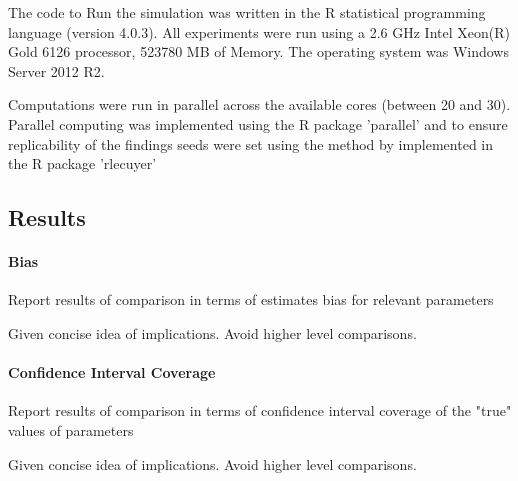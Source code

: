 	The code to Run the simulation was written in the R statistical programming language (version 4.0.3). 
	All experiments were run using a 2.6 GHz Intel Xeon(R) Gold 6126 processor, 523780 MB of Memory. The
	operating system was Windows Server 2012 R2.

	Computations were run in parallel across the available cores (between 20 and 30). Parallel computing 
	was implemented using the R package 'parallel' and to ensure replicability of the findings seeds were
	set using the method by \cite{lecuyer:2002} implemented in the R package 'rlecuyer'

\subsection{Results}

\paragraph{Bias}
	Report results of comparison in terms of estimates bias for relevant parameters

	Given concise idea of implications. Avoid higher level comparisons.
	
\paragraph{Confidence Interval Coverage}
	Report results of comparison in terms of confidence interval coverage of the "true" values of parameters 

	Given concise idea of implications. Avoid higher level comparisons.
	

